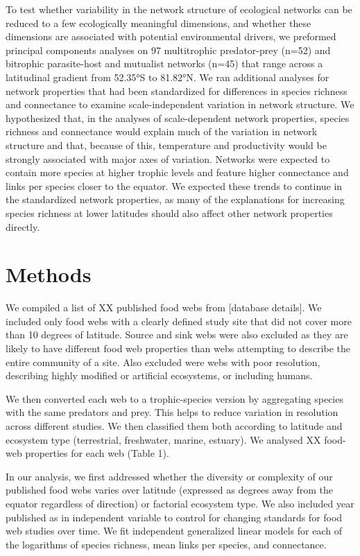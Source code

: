 To test whether variability in the network structure of ecological networks
can be reduced to a few ecologically meaningful dimensions, and whether these
dimensions are associated with potential environmental drivers, we preformed
principal components analyses on 97 multitrophic predator-prey (n=52) and
bitrophic parasite-host and mutualist networks (n=45) that range across a
latitudinal gradient from 52.35°S to 81.82°N. We ran additional analyses for
network properties that had been standardized for differences in species
richness and connectance to examine scale-independent variation in network
structure. We hypothesized that, in the analyses of scale-dependent network
properties, species richness and connectance would explain much of the
variation in network structure and that, because of this, temperature and
productivity would be strongly associated with major axes of variation.
Networks were expected to contain more species at higher trophic levels and
feature higher connectance and links per species closer to the equator. We
expected these trends to continue in the standardized network properties, as
many of the explanations for increasing species richness at lower latitudes
should also affect other network properties directly.


\section*{Methods}

We compiled a list of XX published food webs from [database details]. We
included only food webs with a clearly defined study site that did not cover
more than 10 degrees of latitude. Source and sink webs were also excluded as
they are likely to have different food web properties than webs attempting to
describe the entire community of a site. Also excluded were webs with poor
resolution, describing highly modified or artificial ecosystems, or including
humans.


We then converted each web to a trophic-species version by aggregating species
with the same predators and prey. This helps to reduce variation in resolution
across different studies. We then classified them both according to latitude
and ecosystem type (terrestrial, freshwater, marine, estuary). We analysed XX
food-web properties for each web (Table 1).


In our analysis, we first addressed whether the diversity or complexity of our
published food webs varies over latitude (expressed as degrees away from the
equator regardless of direction) or factorial ecosystem type. We also included
year published as in independent variable to control for changing standards
for food web studies over time. We fit independent generalized linear models
for each of the logarithms of species richness, mean links per species, and
connectance.


